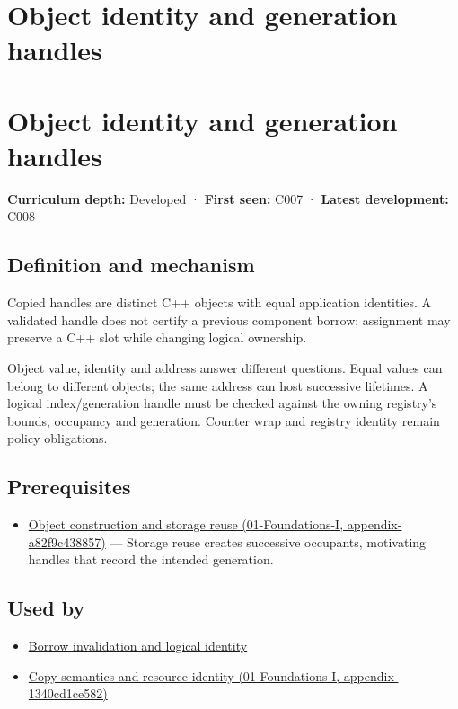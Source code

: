 \hypertarget{appendix-f1581457d322}{}
\section*{Object identity and generation handles}
\section{Object identity and generation handles}\label{object-identity-and-generation-handles}

\textbf{Curriculum depth:} Developed · \textbf{First seen:} C007 · \textbf{Latest development:} C008

\subsection{Definition and mechanism}\label{definition-and-mechanism}

Copied handles are distinct C++ objects with equal application identities. A validated handle does not certify a previous component borrow; assignment may preserve a C++ slot while changing logical ownership.

Object value, identity and address answer different questions. Equal values can belong to different objects; the same address can host successive lifetimes. A logical index/generation handle must be checked against the owning registry's bounds, occupancy and generation. Counter wrap and registry identity remain policy obligations.

\subsection{Prerequisites}\label{prerequisites}

\begin{itemize}
\tightlist
\item
  \href{}{Object construction and storage reuse (01-Foundations-I, appendix-a82f9c438857)} --- Storage reuse creates successive occupants, motivating handles that record the intended generation.
\end{itemize}

\subsection{Used by}\label{used-by}

\begin{itemize}
\tightlist
\item
  \hyperref[appendix-f9b8b9188c7f]{Borrow invalidation and logical identity}
\item
  \href{}{Copy semantics and resource identity (01-Foundations-I, appendix-1340cd1ce582)}
\end{itemize}

